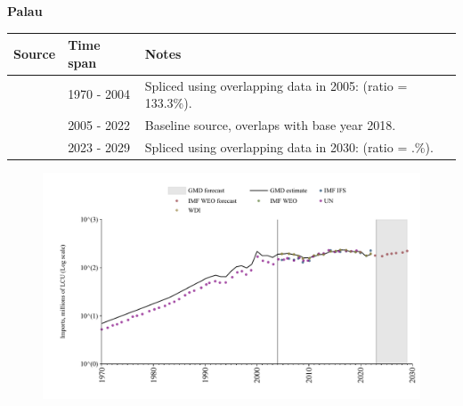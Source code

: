 \documentclass[12pt,a4paper,landscape]{article}
\begin{document}
\begin{adjustbox}{max totalsize={\paperwidth}{\paperheight},center}
\begin{minipage}[t][\textheight][t]{\textwidth}
\vspace*{0.5cm}
{}
\begin{center}
{\Large\bfseries Palau}
\end{center}
\vspace{0.5cm}
\begin{table}[H]
\centering
\small
\begin{tabular}{|l|l|l|}
\hline
\textbf{Source} & \textbf{Time span} & \textbf{Notes} \\
\hline
\rowcolor{white}\cite{UN}& 1970 - 2004 &Spliced using overlapping data in 2005: (ratio = 133.3\%).\\
\rowcolor{lightgray}\cite{WDI}& 2005 - 2022 &Baseline source, overlaps with base year 2018.\\
\rowcolor{white}\cite{IMF_WEO_forecast}& 2023 - 2029 &Spliced using overlapping data in 2030: (ratio = .\%).\\
\hline
\end{tabular}
\end{table}
\begin{figure}[H]
\centering
\includegraphics[width=\textwidth,height=0.6\textheight,keepaspectratio]{graphs/PLW_imports.pdf}
\end{figure}
\end{minipage}
\end{adjustbox}
\end{document}
